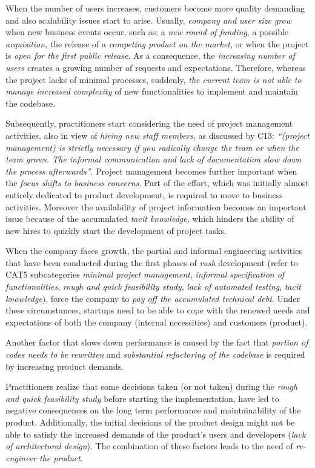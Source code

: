 \documentclass[10pt,journal,letterpaper,compsoc]{IEEEtran}
\begin{document}
When the number of users increases, customers become more quality demanding and 
also scalability issues start to arise. Usually, \textit{company and user size 
grow} when new business events occur, such as: a \textit{new round of funding}, 
a possible \textit{acquisition}, the release of a \textit{competing product on 
the market}, or when the project is \textit{open for the first public release}. 
As a consequence, the \textit{increasing number of users} creates a growing 
number of requests and expectations. Therefore, whereas the project lacks of 
minimal processes, suddenly, \textit{the current team is not able to manage 
increased complexity} of new functionalities to implement and maintain the 
codebase.

Subsequently, practitioners start considering the need of project management 
activities, also in view of \textit{hiring new staff members}, as discussed by 
C13: \textit{``(project management) is strictly necessary if you radically 
change the team or when the team grows.  The informal communication and lack of 
documentation slow down the process afterwards''}.  Project management becomes 
further important when the \textit{focus shifts to business concerns}. Part of 
the effort, which was initially almost entirely dedicated to product 
development, is required to move to business activities. Moreover the 
availability of project information becomes an important issue because of the 
accumulated \textit{tacit knowledge}, which hinders the ability of new hires to 
quickly start the development of project tasks.

When the company faces growth, the partial and informal engineering activities 
that have been conducted during the first phases of \textit{rush} development 
(refer to CAT5 subcategories \textit{minimal project management}, 
\textit{informal specification of functionalities}, \textit{rough and quick 
feasibility study}, \textit{lack of automated testing}, \textit{tacit 
knowledge}), force the company to \textit{pay off the accumulated technical 
debt}. Under these circumstances, startups need to be able to cope with the 
renewed needs and expectations of both the company (internal necessities) and 
customers (product).

Another factor that slows down performance is caused by the fact that 
\textit{portion of codes needs to be rewritten} and \textit{substantial 
refactoring of the codebase} is required by increasing product demands.

Practitioners realize that some decisions taken (or not taken) during the 
\textit{rough and quick feasibility study} before starting the implementation, 
have led to negative consequences on the long term performance and 
maintainability of the product. Additionally, the initial decisions of the 
product design might not be able to satisfy the increased demands of the 
product's users and developers (\textit{lack of architectural design}). The 
combination of these factors leads to the need of \textit{re-engineer the 
product}.
\end{document}
